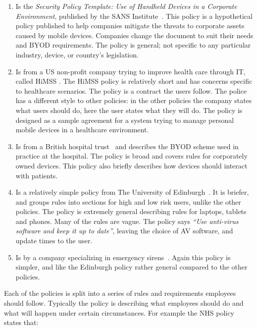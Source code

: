 \documentclass[thesis.tex]{subfiles}
\begin{document}
\begin{enumerate}
\item Is the \emph{Security Policy Template: Use of Handheld Devices
    in a Corporate Environment}, published by the SANS
  Institute~\cite{nicholas_r._c._guerin_security_2008}. This policy is a
  hypothetical policy published to help companies mitigate the threats
  to corporate assets caused by mobile devices. Companies change the
  document to suit their needs and BYOD requirements. The policy is
  general; not specific to any particular industry, device, or country's
  legislation.
\item Is from a US non-profit company trying to improve health care through IT, called \ac{HiMSS} \cite{healthcare_information_and_management_systems_society_mobile_2012}. The
  \ac{HiMSS} policy is relatively short and has concerns specific to
  healthcare scenarios. The policy is a contract the users follow. The
  police has a different style to other policies: in the other policies
  the company states what users should do, here the user states what
  they will do.  The policy is designed as a sample agreement for a
  system trying to manage personal mobile devices in a healthcare
  environment.
\item Is from a British hospital trust~\cite{kennington_mobiles_2014}
  and describes the BYOD scheme used in practice at the hospital.  The
  policy is broad and covers rules for corporately owned devices.  This
  policy also briefly describes how devices should interact with
  patients.
\item Is a relatively simple policy from The University of
  Edinburgh~\cite{williamson_bring_2015}. It is briefer, and groups
  rules into sections for high and low risk users, unlike the other
  policies.  The policy is extremely general describing rules for
  laptops, tablets and phones.  Many of the rules are vague.
  The policy says \emph{``Use anti-virus software and keep it up
    to date''}, leaving the choice of AV software, and
  update times to the user.
\item Is by a company specializing in emergency
  sirens~\cite{code3pse.org_sample_nodate}. Again this policy is simpler,
  and like the Edinburgh policy rather general compared to the other policies.
\end{enumerate}

Each of the policies is split into a series of rules and requirements employees
should follow. Typically the policy is describing what employees should
do and what will happen under certain circumstances. For example the NHS policy
states that:
\end{document}
